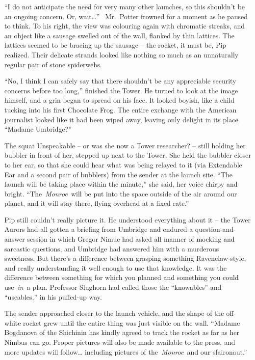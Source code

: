 ``I do not anticipate the need for very many other launches, so this
shouldn't be an ongoing concern. Or, wait\ldots{}'' ~Mr.~Potter frowned
for a moment as he paused to think. To his right, the view was colouring
again with chromatic streaks, and an object like a sausage swelled out
of the wall, flanked by thin lattices. The lattices seemed to be bracing
up the sausage -- the rocket, it must be, Pip realized. Their delicate
strands looked like nothing so much as an unnaturally regular pair of
stone spiderwebs.

``No, I think I can safely say that there shouldn't be any appreciable
security concerns before too long,'' finished the Tower. He turned to
look at the image himself, and a grin began to spread on his face. It
looked boyish, like a child tucking into his first Chocolate Frog. The
entire exchange with the American journalist looked like it had been
wiped away, leaving only delight in its place. ``Madame Umbridge?''

The squat Unspeakable -- or was she now a Tower researcher? -- still
holding her bubbler in front of her, stepped up next to the Tower. She
held the bubbler closer to her ear, so that she could hear what was
being relayed to it (via Extendable Ear and a second pair of bubblers)
from the sender at the launch site. ``The launch will be taking place
within the minute,'' she said, her voice chirpy and bright.
``The~\emph{Monroe}~will be put into the space outside of the air around
our planet, and it will stay there, flying overhead at a fixed rate.''

Pip still couldn't really picture it. He understood everything about it
-- the Tower Aurors had all gotten a briefing from Umbridge and endured
a question-and-answer session in which Gregor Nimue had asked all manner
of mocking and sarcastic questions, and Umbridge had answered him with a
murderous sweetness. But there's a difference between grasping something
Ravenclaw-style, and really understanding it well enough to use that
knowledge. It was the difference between something for which you planned
and something you could use~\emph{in}~a plan. Professor Slughorn had
called those the ``knowables'' and ``useables,'' in his puffed-up way.

The sender approached closer to the launch vehicle, and the shape of the
off-white rocket grew until the entire thing was just visible on the
wall. ``Madame Bogdanova of the Shichinin has kindly agreed to track the
rocket as far as her Nimbus can go. Proper pictures will also be made
available to the press, and more updates will follow\ldots{} including
pictures of the~\emph{Monroe}~and our sfaironaut.''

